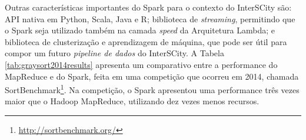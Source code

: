 Outras características importantes do Spark para o contexto do
InterSCity são: API nativa em Python, Scala, Java e R; biblioteca de
\textit{streaming}, permitindo que o Spark seja utilizado também na camada
\textit{speed} da Arquitetura Lambda; e biblioteca de clusterização e
aprendizagem de máquina, que pode ser útil para compor um futuro \textit{pipeline
de dados} do InterSCity. A Tabela \ref{tab:graysort2014results} apresenta
um comparativo entre a performance do MapReduce e do Spark, feita em uma
competição que ocorreu em 2014, chamada
SortBenchmark\footnote{\url{http://sortbenchmark.org/}}. Na competição, o Spark
apresentou uma performance três vezes maior que o Hadoop MapReduce, utilizando
dez vezes menos recursos.


\begin{table}[!htbp]
    \centering
    \caption[Resultados da Sort Benchmark 2014, categoria GraySort]{Resultados da Sort Benchmark 2014, categoria GraySort. Fonte: Databricks, 2014\footnotemark.}
    \label{tab:graysort2014results}
\end{table}

